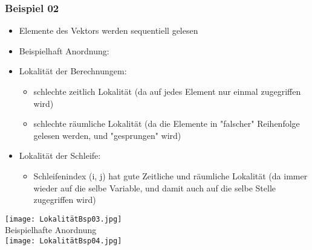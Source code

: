 		\subsubsection{Beispiel 02}
			\begin{minipage}{0.5\textwidth}
				\begin{itemize}
					\item Elemente des Vektors werden sequentiell gelesen
					\item Beispielhaft Anordnung:
					\item Lokalität der Berechnungem:
						\begin{itemize}
							\item schlechte zeitlich Lokalität (da auf jedes Element nur einmal zugegriffen wird)
							\item schlechte räumliche Lokalität (da die Elemente in "falscher" Reihenfolge gelesen werden, und "gesprungen" wird)
						\end{itemize}
					\item Lokalität der Schleife:
						\begin{itemize}
							\item Schleifenindex (i, j) hat gute Zeitliche und räumliche Lokalität
								(da immer wieder auf die selbe Variable, und damit auch auf die selbe Stelle zugegriffen wird)
						\end{itemize}
				\end{itemize}
			\end{minipage}
			\begin{minipage}{0.45\textwidth}
				\begin{center}	
					\texttt{[image: LokalitätBsp03.jpg]} \\
					Beispielhafte Anordnung \\
					\texttt{[image: LokalitätBsp04.jpg]}
				\end{center}
			\end{minipage}


